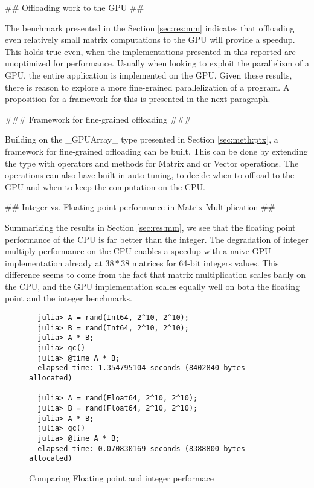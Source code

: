 \begin{markdown}
## Offloading work to the GPU ##

The benchmark presented in the Section \ref{sec:res:mm} indicates that
offloading even relatively small matrix computations to the GPU will
provide a speedup. This holds true even, when the implementations
presented in this reported are unoptimized for performance. Usually
when looking to exploit the parallelizm of a GPU, the entire
application is implemented on the GPU. Given these results, there is
reason to explore a more fine-grained parallelization of a program. A
proposition for a framework for this is presented in the next
paragraph.

### Framework for fine-grained offloading ###

Building on the _GPUArray_ type presented in Section
\ref{sec:meth:ptx}, a framework for fine-grained offloading can be
built. This can be done by extending the type with operators and
methods for Matrix and or Vector operations. The operations can also
have built in auto-tuning, to decide when to offload to the \gls{GPU}
and when to keep the computation on the \gls{CPU}.

## Integer vs. Floating point performance in Matrix Multiplication ##

Summarizing the results in Section \ref{sec:res:mm}, we see that the
floating point performance of the \gls{CPU} is far better than the
integer. The degradation of integer multiply performance on the
\gls{CPU} enables a speedup with a naive GPU implementation already at
$38*38$ matrices for 64-bit integers values. This difference seems to
come from the fact that matrix multiplication scales badly on the CPU,
and the GPU implementation scales equally well on both the floating
point and the integer benchmarks.


\begin{figure}[H]
  

  \begin{verbatim}
  julia> A = rand(Int64, 2^10, 2^10);
  julia> B = rand(Int64, 2^10, 2^10);
  julia> A * B;
  julia> gc()
  julia> @time A * B;
  elapsed time: 1.354795104 seconds (8402840 bytes allocated)
  
  julia> A = rand(Float64, 2^10, 2^10);
  julia> B = rand(Float64, 2^10, 2^10);
  julia> A * B;
  julia> gc()
  julia> @time A * B;
  elapsed time: 0.070830169 seconds (8388800 bytes allocated)
  \end{verbatim}
  \caption{Comparing Floating point and integer performace}
  \label{fig:julia:mm}
\end{figure}


\end{markdown}
